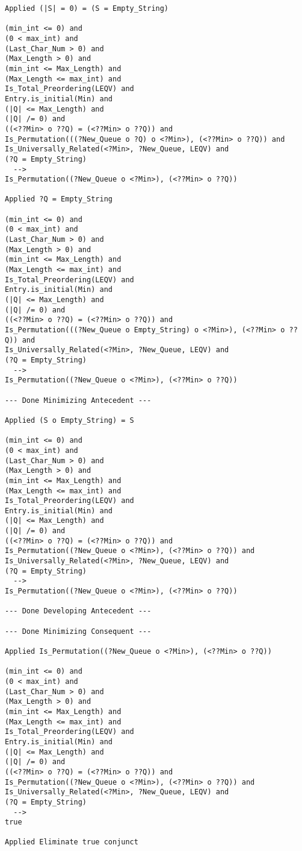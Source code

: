 \begin{lstlisting}[language=resolve]
Applied (|S| = 0) = (S = Empty_String)

(min_int <= 0) and
(0 < max_int) and
(Last_Char_Num > 0) and
(Max_Length > 0) and
(min_int <= Max_Length) and
(Max_Length <= max_int) and
Is_Total_Preordering(LEQV) and
Entry.is_initial(Min) and
(|Q| <= Max_Length) and
(|Q| /= 0) and
((<??Min> o ??Q) = (<??Min> o ??Q)) and
Is_Permutation(((?New_Queue o ?Q) o <?Min>), (<??Min> o ??Q)) and
Is_Universally_Related(<?Min>, ?New_Queue, LEQV) and
(?Q = Empty_String)
  -->
Is_Permutation((?New_Queue o <?Min>), (<??Min> o ??Q))

Applied ?Q = Empty_String

(min_int <= 0) and
(0 < max_int) and
(Last_Char_Num > 0) and
(Max_Length > 0) and
(min_int <= Max_Length) and
(Max_Length <= max_int) and
Is_Total_Preordering(LEQV) and
Entry.is_initial(Min) and
(|Q| <= Max_Length) and
(|Q| /= 0) and
((<??Min> o ??Q) = (<??Min> o ??Q)) and
Is_Permutation(((?New_Queue o Empty_String) o <?Min>), (<??Min> o ??Q)) and
Is_Universally_Related(<?Min>, ?New_Queue, LEQV) and
(?Q = Empty_String)
  -->
Is_Permutation((?New_Queue o <?Min>), (<??Min> o ??Q))

--- Done Minimizing Antecedent ---

Applied (S o Empty_String) = S

(min_int <= 0) and
(0 < max_int) and
(Last_Char_Num > 0) and
(Max_Length > 0) and
(min_int <= Max_Length) and
(Max_Length <= max_int) and
Is_Total_Preordering(LEQV) and
Entry.is_initial(Min) and
(|Q| <= Max_Length) and
(|Q| /= 0) and
((<??Min> o ??Q) = (<??Min> o ??Q)) and
Is_Permutation((?New_Queue o <?Min>), (<??Min> o ??Q)) and
Is_Universally_Related(<?Min>, ?New_Queue, LEQV) and
(?Q = Empty_String)
  -->
Is_Permutation((?New_Queue o <?Min>), (<??Min> o ??Q))

--- Done Developing Antecedent ---

--- Done Minimizing Consequent ---

Applied Is_Permutation((?New_Queue o <?Min>), (<??Min> o ??Q))

(min_int <= 0) and
(0 < max_int) and
(Last_Char_Num > 0) and
(Max_Length > 0) and
(min_int <= Max_Length) and
(Max_Length <= max_int) and
Is_Total_Preordering(LEQV) and
Entry.is_initial(Min) and
(|Q| <= Max_Length) and
(|Q| /= 0) and
((<??Min> o ??Q) = (<??Min> o ??Q)) and
Is_Permutation((?New_Queue o <?Min>), (<??Min> o ??Q)) and
Is_Universally_Related(<?Min>, ?New_Queue, LEQV) and
(?Q = Empty_String)
  -->
true

Applied Eliminate true conjunct


\end{lstlisting}
